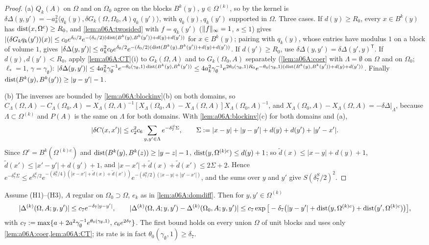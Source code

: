 \begin{proof}
(a) $Q_k(A)$ on $\Omega$ and on $\Omega_0$ agree on the blocks $B^k(y)$, $y\in\Omega^{(k)}$, so by \cite[(1.14)]{Ba4} the kernel is $\delta\Delta(y,y')=-a_k^2\langle q_k(y),\delta G_k(\Omega,\Omega_0,A)q_k(y')\rangle$, with $q_k(y),q_k(y')$ supported in $\Omega$. Three cases. If $d(y)\ge R_0$, every $x\in B^k(y)$ has $\operatorname{dist}(x,\Omega^c)\ge R_0$, and \cref{lem:a06A:twosided} with $f=q_k(y')$ ($\lVert f\rVert_\infty=1$, $s\le1$) gives $|(\delta G_kq_k(y'))(x)|\le c_0e^{\delta_0/2}e^{-(\delta_0/2)(\operatorname{dist}(B^k(y),B^k(y'))+d(y)+d(y'))}$ for $x\in B^k(y)$; pairing with $q_k(y)$, whose entries have modulus $1$ on a block of volume $1$, gives $|\delta\Delta(y,y')|\le a_k^2c_0e^{\delta_0/2}e^{-(\delta_0/2)(\operatorname{dist}(B^k(y),B^k(y'))+d(y)+d(y'))}$. If $d(y')\ge R_0$, use $\delta\Delta(y,y')=\delta\Delta(y',y)^{\mathsf T}$. If $d(y),d(y')<R_0$, apply \cref{lem:a06A:CT}(i) to $G_k(\Omega,A)$ and to $G_k(\Omega_0,A)$ separately (\cref{lem:a06A:coer} with $\Lambda=\emptyset$ on $\Omega$ and on $\Omega_0$; $\ell_*=1$, $\gamma=\gamma_\emptyset$): $|\delta\Delta(y,y')|\le4a_k^2\gamma_\emptyset^{-1}e^{-\theta_0(\gamma_\emptyset,1)\operatorname{dist}(B^k(y),B^k(y'))}\le4a_k^2\gamma_\emptyset^{-1}e^{2\theta_0(\gamma_\emptyset,1)R_0}e^{-\theta_0(\gamma_\emptyset,1)(\operatorname{dist}(B^k(y),B^k(y'))+d(y)+d(y'))}$. Finally $\operatorname{dist}(B^k(y),B^k(y'))\ge|y-y'|-1$.

(b) The inverses are bounded by \cref{lem:a06A:blockinv}(b) on both domains, so $C_\Lambda(\Omega,A)-C_\Lambda(\Omega_0,A)=X_\Lambda(\Omega,A)^{-1}[X_\Lambda(\Omega_0,A)-X_\Lambda(\Omega,A)]X_\Lambda(\Omega_0,A)^{-1}$, and $X_\Lambda(\Omega_0,A)-X_\Lambda(\Omega,A)=-\delta\Delta|_\Lambda$, because $\Lambda\subset\Omega^{(k)}$ and $P(A)$ is the same on $\Lambda$ for both domains. With \cref{lem:a06A:blockinv}(c) for both domains and (a),
\[
|\delta C(x,x')|\le c_2^2c_6\sum_{y,y'\in\Lambda}e^{-\delta^S_7\Sigma},\qquad\Sigma:=|x-y|+|y-y'|+d(y)+d(y')+|y'-x'| .
\]
Since $\Omega^c=B^k(\Omega^{(k)c})$ and $\operatorname{dist}(B^k(y),B^k(z))\ge|y-z|-1$, $\operatorname{dist}(y,\Omega^{(k)c})\le d(y)+1$; so $\tilde d(x)\le|x-y|+d(y)+1$, $\tilde d(x')\le|x'-y'|+d(y')+1$, and $|x-x'|+\tilde d(x)+\tilde d(x')\le2\Sigma+2$. Hence $e^{-\delta^S_7\Sigma}\le e^{\delta^S_7/2}e^{-(\delta^S_7/4)(|x-x'|+\tilde d(x)+\tilde d(x'))}e^{-(\delta^S_7/2)(|x-y|+|y'-x'|)}$, and the sums over $y$ and $y'$ give $S(\delta^S_7/2)^2$.
\end{proof}

\begin{proposition}[{\cite[Prop.~2.2, (2.27)--(2.29)]{Ba1}}]\label{prop:a06A:Ba1P22}
Assume (H1)--(H3), $A$ regular on $\Omega_0\supset\Omega$, $e_k$ as in \cref{lem:a06A:domdiff}. Then for $y,y'\in\Omega^{(k)}$
\[
|\Delta^{(k)}(\Omega,A;y,y')|\le c_7e^{-\delta_7|y-y'|},\qquad|\Delta^{(k)}(\Omega,A;y,y')-\Delta^{(k)}(\Omega_0,A;y,y')|\le c_7\exp\big[-\delta_7\big(|y-y'|+\operatorname{dist}(y,\Omega^{(k)c})+\operatorname{dist}(y',\Omega^{(k)c})\big)\big],
\]
with $c_7:=\max\{a+2a^2\gamma_\emptyset^{-1}e^{\theta_0(\gamma_\emptyset,1)},\,c_6e^{2\delta_7}\}$. The first bound holds on every union $\Omega$ of unit blocks and uses only \cref{lem:a06A:coer,lem:a06A:CT}; its rate is in fact $\theta_0(\gamma_\emptyset,1)\ge\delta_7$.
\end{proposition}

